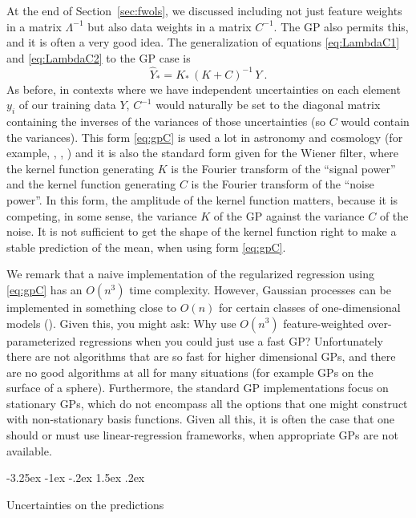 \documentclass[12pt,letterpaper]{article}
\makeatletter
\renewcommand\section{\@startsection {section}{1}{\z@}%
  {-3.25ex \@plus -1ex \@minus -.2ex}%
  {1.5ex \@plus .2ex}%
  {\raggedright\normalfont\large\bfseries}}
\newcommand{\sectionname}{Section}
\makeatother
\begin{document}
At the end of \sectionname~\ref{sec:fwols}, we discussed including not just feature weights in a matrix $\Lambda^{-1}$ but also data weights in a matrix $C^{-1}$. The GP also permits this, and it is often a very good idea. The generalization of equations \eqref{eq:LambdaC1} and \eqref{eq:LambdaC2} to the GP case is 
\begin{equation}\label{eq:gpC}
    \hat{Y}_\ast = K_\ast\,(K + C)^{-1}\,Y
    ~.
\end{equation}
As before, in contexts where we have independent uncertainties on each element $y_i$ of our training data $Y$, $C^{-1}$ would naturally be set to the diagonal matrix containing the inverses of the variances of those uncertainties (so $C$ would contain the variances).
This form \eqref{eq:gpC} is used a lot in astronomy and cosmology (for example, \citealt{zaroubi}, \citealt{aigrain}, \citealt{celerite}) and it is also the standard form given for the Wiener filter, where the kernel function generating $K$ is the Fourier transform of the ``signal power'' and the kernel function generating $C$ is the Fourier transform of the ``noise power''.
In this form, the amplitude of the kernel function matters, because it is competing, in some sense, the variance $K$ of the GP against the variance $C$ of the noise.
It is not sufficient to get the shape of the kernel function right to make a stable prediction of the mean, when using form \eqref{eq:gpC}.

We remark that a naive implementation of the regularized regression using \eqref{eq:gpC} has an $O(n^3)$ time complexity.
However, Gaussian processes can be implemented in something close to $O(n)$ for certain classes of one-dimensional models (\citealt{ambikasaran2015fast, celerite}).
Given this, you might ask: Why use $O(n^3)$ feature-weighted over-parameterized regressions when you could just use a fast GP?
Unfortunately there are not algorithms that are so fast for higher dimensional GPs, and there are no good algorithms at all for many situations (for example GPs on the surface of a sphere).
Furthermore, the standard GP implementations focus on stationary GPs, which do not encompass all the options that one might construct with non-stationary basis functions.
Given all this, it is often the case that one should or must use linear-regression frameworks, when appropriate GPs are not available.

\section{Uncertainties on the predictions}\label{sec:uncertainty}
\end{document}
